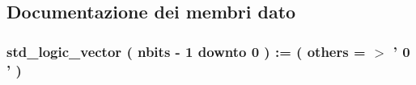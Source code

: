 \subsection{Documentazione dei membri dato}
\hypertarget{classtb__adder_1_1behavior_a1c7a41b72844f6ed4f7cf1ab81102a2a}{
\subsubsection[{add1}]{ {\bfseries \textcolor{vhdlchar}{std\+\_\+logic\+\_\+vector}\textcolor{vhdlchar}{ }\textcolor{vhdlchar}{(}\textcolor{vhdlchar}{ }\textcolor{vhdlchar}{ }\textcolor{vhdlchar}{ }\textcolor{vhdlchar}{ }{\bfseries {\bf nbits}} \textcolor{vhdlchar}{-\/}\textcolor{vhdlchar}{ } \textcolor{vhdldigit}{1} \textcolor{vhdlchar}{ }\textcolor{vhdlchar}{downto}\textcolor{vhdlchar}{ }\textcolor{vhdlchar}{ } \textcolor{vhdldigit}{0} \textcolor{vhdlchar}{ }\textcolor{vhdlchar}{)}\textcolor{vhdlchar}{ }\textcolor{vhdlchar}{ }\textcolor{vhdlchar}{ }\textcolor{vhdlchar}{\+:}\textcolor{vhdlchar}{=}\textcolor{vhdlchar}{ }\textcolor{vhdlchar}{(}\textcolor{vhdlchar}{ }\textcolor{vhdlchar}{ }\textcolor{vhdlchar}{others}\textcolor{vhdlchar}{ }\textcolor{vhdlchar}{ }\textcolor{vhdlchar}{=}\textcolor{vhdlchar}{ }\textcolor{vhdlchar}{$>$}\textcolor{vhdlchar}{ }\textcolor{vhdlchar}{'}\textcolor{vhdlchar}{ } \textcolor{vhdldigit}{0} \textcolor{vhdlchar}{ }\textcolor{vhdlchar}{'}\textcolor{vhdlchar}{ }\textcolor{vhdlchar}{)}\textcolor{vhdlchar}{ }} \hspace{0.3cm}{\ttfamily [Signal]}}}\label{classtb__adder_1_1behavior_a1c7a41b72844f6ed4f7cf1ab81102a2a}
